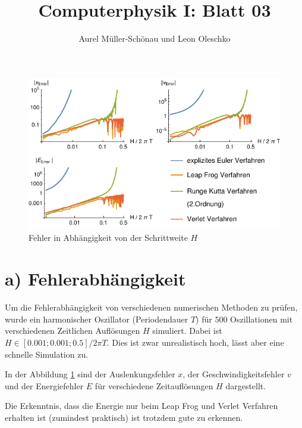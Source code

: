 




\title{Computerphysik I: Blatt 03}
\author{Aurel Müller-Schönau und Leon Oleschko}
\maketitle

\begin{figure}[h!]
	\centering
	\includegraphics[width=\linewidth]{A_plot.pdf}
	\caption{Fehler in Abhängigkeit von der Schrittweite $H$}
	\label{fig:fehler}
\end{figure}


\section*{a) Fehlerabhängigkeit}
Um die Fehlerabhängigkeit von verschiedenen numerischen Methoden zu prüfen, wurde ein harmonischer Oszillator (Periodendauer $T$) für $500$ Oszillationen mit verschiedenen Zeitlichen Auflösungen $H$ simuliert. Dabei ist $H\in[0.001;0.001;0.5]/2\pi T$. 
Dies ist zwar unrealistisch hoch, lässt aber eine schnelle Simulation zu.

In der Abbildung \ref{fig:fehler} sind der Auslenkungsfehler $x$, der Geschwindigkeitsfehler $v$ und der Energiefehler $E$ für verschiedene Zeitauflösungen $H$ dargestellt.

Die Erkenntnis, dass die Energie nur beim Leap Frog und Verlet Verfahren erhalten ist (zumindest praktisch) ist trotzdem gute zu erkennen.

